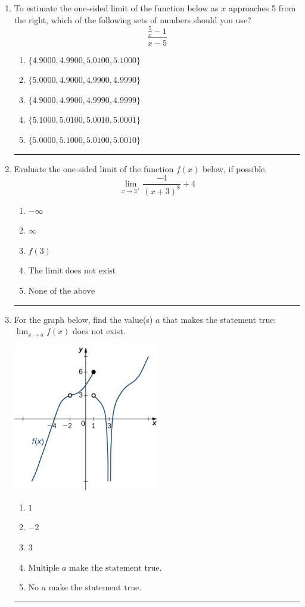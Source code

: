 \documentclass[14pt]{extbook}
\newcommand{\litem}[1]{\item#1\hspace*{-1cm}\rule{\textwidth}{0.4pt}}
\begin{document}
\begin{enumerate}
{\begin{enumerate}[label=\Alph*.]
\end{enumerate} }
\litem{
To estimate the one-sided limit of the function below as $x$ approaches 5 from the right, which of the following sets of numbers should you use?\[ \frac{\frac{5}{x} - 1}{x - 5} \]\begin{enumerate}[label=\Alph*.]
\item \( \{ 4.9000, 4.9900, 5.0100, 5.1000 \} \)
\item \( \{ 5.0000, 4.9000, 4.9900, 4.9990 \} \)
\item \( \{ 4.9000, 4.9900, 4.9990, 4.9999 \} \)
\item \( \{ 5.1000, 5.0100, 5.0010, 5.0001 \} \)
\item \( \{ 5.0000, 5.1000, 5.0100, 5.0010 \} \)

\end{enumerate} }
\litem{
Evaluate the one-sided limit of the function $f(x)$ below, if possible.\[ \lim_{x \rightarrow 3^+} \frac{-4}{(x+3)^8}+4 \]\begin{enumerate}[label=\Alph*.]
\item \( -\infty \)
\item \( \infty \)
\item \( f(3) \)
\item \( \text{The limit does not exist} \)
\item \( \text{None of the above} \)

\end{enumerate} }
\litem{
For the graph below, find the value(s) $a$ that makes the statement true: $ \displaystyle \lim_{x \rightarrow a} f(x)$ does not exist.
\begin{center}
    \includegraphics[width=0.5\textwidth]{../Figures/evaluateLimitGraphicallyCopyC.png}
\end{center}
\begin{enumerate}[label=\Alph*.]
\item \( 1 \)
\item \( -2 \)
\item \( 3 \)
\item \( \text{Multiple } a \text{ make the statement true}. \)
\item \( \text{No } a \text{ make the statement true}. \)


\end{enumerate}}
\end{enumerate}
\end{document}
